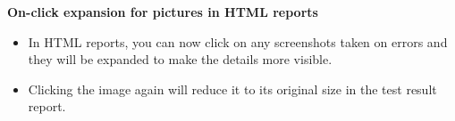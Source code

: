 \textbf{On-click expansion for pictures in HTML reports}
\begin{itemize}
\item In HTML reports, you can now click on any screenshots taken on errors and they will be expanded to make the details more visible.
\item Clicking the image again will reduce it to its original size in the test result report.
\end{itemize}
